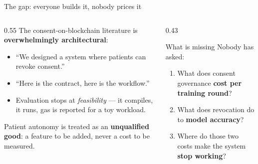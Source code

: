 \documentclass[aspectratio=169, 11pt]{beamer}
\begin{document}
\begin{frame}{The gap: everyone builds it, nobody prices it}
\begin{columns}[T]
\begin{column}{0.55\textwidth}
The consent-on-blockchain literature is \textbf{overwhelmingly
architectural}:
\begin{itemize}
\item ``We designed a system where patients can revoke consent.''
\item ``Here is the contract, here is the workflow.''
\item Evaluation stops at \emph{feasibility} --- it compiles, it runs,
      gas is reported for a toy workload.
\end{itemize}
\vspace{0.4em}
Patient autonomy is treated as an \textbf{unqualified good}: a feature to be
added, never a cost to be measured.
\end{column}
\begin{column}{0.43\textwidth}
\begin{alertblock}{What is missing}
Nobody has asked:
\begin{enumerate}
\item What does consent governance \textbf{cost per training round}?
\item What does revocation do to \textbf{model accuracy}?
\item Where do those two costs make the system \textbf{stop working}?
\end{enumerate}
\end{alertblock}
\end{column}
\end{columns}
\end{frame}
\end{document}
